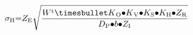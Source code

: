 \[{\sigma }_{\mathrm{H}}\mathrm{=}Z_{\mathrm{E}}\sqrt{\frac{W^{\mathrm{t}}{\mathrm{\timesbullet }K}_{\mathrm{O}}{\mathrm{\bullet }K}_{\mathrm{V}}\mathrm{\bullet }K_{\mathrm{S}}\mathrm{\bullet }K_{\mathrm{H}}\mathrm{\bullet }Z_{\mathrm{R}}}{D_{\mathrm{P}}\mathrm{\bullet }b\mathrm{\bullet }Z_{\mathrm{I}}}}\] 
